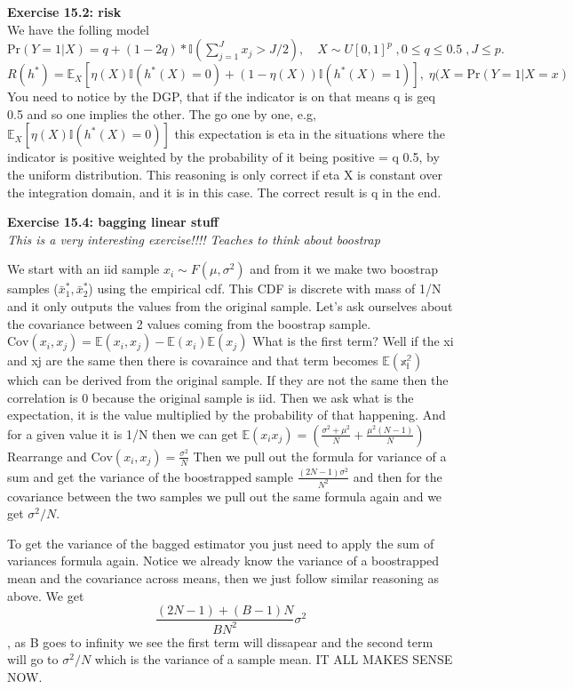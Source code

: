 \documentclass{article}
\begin{document}
\textbf{Exercise 15.2: risk}\\
We have the folling model $\text{Pr}(Y=1 | X) = q + (1 -2q)* \mathbb{I}(\sum_{j=1}^{J}x_j > J/2), \quad X \sim U[0,1]^p \;, 0 \leq q \leq 0.5 \;, J \leq p. $
$$R(h^*) = \mathbb{E}_X[\eta(X)\mathbb{I}(h^*(X)=0) + (1-\eta(X))\mathbb{I}(h^*(X)=1)], \; \eta(X = \text{Pr}(Y=1|X=x) $$
You need to notice by the DGP, that if the indicator is on that means q is geq 0.5 and so one implies the other.
The go one by one, e.g, $\mathbb{E}_X[\eta (X)\mathbb{I}(h^*(X)=0)] $
this expectation is eta in the situations where the indicator is positive weighted by the probability of it being positive =  q 0.5, by the uniform distribution.
This reasoning is only correct if eta X is constant over the integration domain, and it is in this case.
The correct result is q in the end. 

\textbf{Exercise 15.4: bagging linear stuff}\\
\textit{This is a very interesting exercise!!!! Teaches to think about boostrap} 


We start with an iid sample $x_i \sim F(\mu,\sigma^2)$ and from it we make two boostrap samples ($\bar{x}_1^*, \bar{x}_2^*$) using the empirical cdf.
This CDF is discrete with mass of 1/N and it only outputs the values from the original sample. 
Let's ask ourselves about the covariance between 2 values coming from the boostrap sample. 
$\text{Cov}(x_i,x_j) = \mathbb{E}(x_i,x_j) - \mathbb{E}(x_i)\mathbb{E}(x_j)$
What is the first term? Well if the xi and xj are the same then there is covaraince and that term becomes $\mathbb{E(x_i^2)} $ which can be derived 
from the original sample. If they are not the same then the correlation is 0 because the original sample is iid. 
Then we ask what is the expectation, it is the value multiplied by the probability of that happening. And for a given value it is 1/N 
then we can get $\mathbb{E} (x_i x_j) = (\frac{\sigma^2 + \mu^2}{N} + \frac{\mu^2(N-1)}{N})$  
Rearrange and $\text{Cov}(x_i,x_j) = \frac{\sigma^2}{N}$
Then we pull out the formula for variance of a sum and get the variance of the boostrapped sample $\frac{(2N-1)\sigma^2}{N^2}$ 
and then for the covariance between the two samples we pull out the same formula again and we get $\sigma^2/N$.

To get the variance of the bagged estimator you just need to apply the sum of variances formula again. 
Notice we already know the variance of a boostrapped mean and the covariance across means, then we just follow similar reasoning as above. 
We get $$\frac{(2N -1) + (B-1)N}{B N^2}\sigma^2$$, as B goes to infinity we see the first term 
will dissapear and the second term will go to $\sigma^2/N$ which is the variance of a sample mean. IT ALL MAKES SENSE NOW.
\end{document}
